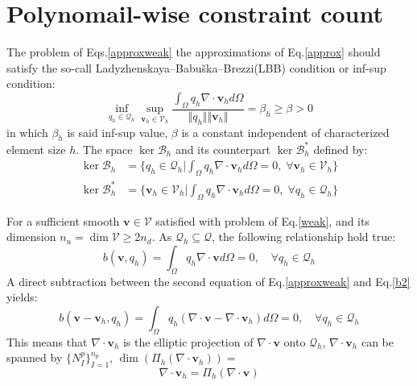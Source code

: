 \section{Polynomail-wise constraint count}
The problem of Eqs.\eqref{approxweak} the approximations of Eq.\eqref{approx} should satisfy the so-call Ladyzhenskaya–Babuška–Brezzi(LBB) condition or inf-sup condition:
\begin{equation}
    \inf_{q_h \in \mathcal Q_h} \sup_{\boldsymbol v_h \in \mathcal V_h} \frac{\int_{\Omega} q_h \nabla \cdot \boldsymbol v_h d\Omega}{\Vert q_h \Vert \Vert \boldsymbol v_h \Vert} = \beta_h \ge \beta > 0
\end{equation}
in which $\beta_h$ is said inf-sup value, $\beta$ is a constant independent of characterized element size $h$.
The space $\ker \mathcal B_h$ and its counterpart $\ker \mathcal B_h^*$ defined by:
\begin{align}
    \ker \mathcal B_h &= \{q_h \in \mathcal Q_h \vert \int_{\Omega} q_h \nabla \cdot \boldsymbol v_h d\Omega = 0,\; \forall \boldsymbol v_h \in \mathcal V_h\} \\
    \ker \mathcal B_h^* &= \{\boldsymbol v_h \in \mathcal V_h \vert \int_{\Omega} q_h \nabla \cdot \boldsymbol v_h d\Omega = 0,\; \forall q_h \in \mathcal Q_h\}
\end{align} \par
For a sufficient smooth $\boldsymbol v \in \mathcal V$ satisfied with problem of Eq.\eqref{weak}, and its dimension $n_u = \dim \mathcal V \ge 2 n_d$.
As $\mathcal Q_h \subseteq \mathcal Q$, the following relationship hold true:
\begin{equation}\label{b2}
b(\boldsymbol v,q_h) = \int_{\Omega} q_h \nabla \cdot \boldsymbol v d\Omega = 0, \quad \forall q_h \in \mathcal Q_h
\end{equation}
A direct subtraction between the second equation of Eq.\eqref{approxweak} and Eq.\eqref{b2} yields: 
\begin{equation}
b(\boldsymbol v - \boldsymbol v_h, q_h) = \int_{\Omega} q_h (\nabla\cdot \boldsymbol v - \nabla \cdot \boldsymbol v_h)d\Omega = 0, \quad \forall q_h \in \mathcal Q_h
\end{equation}
This means that $\nabla \cdot \boldsymbol v_h$ is the elliptic projection of $\nabla \cdot \boldsymbol v$ onto $\mathcal Q_h$, $\nabla \cdot \boldsymbol v_h$ can be spanned by $\{N_I^p\}_{I=1}^{n_p}$, $\dim(\Pi_h(\nabla \cdot \boldsymbol v_h)) =$
\begin{equation}
\nabla \cdot \boldsymbol v_h = \Pi_h (\nabla \cdot \boldsymbol v)
\end{equation}
